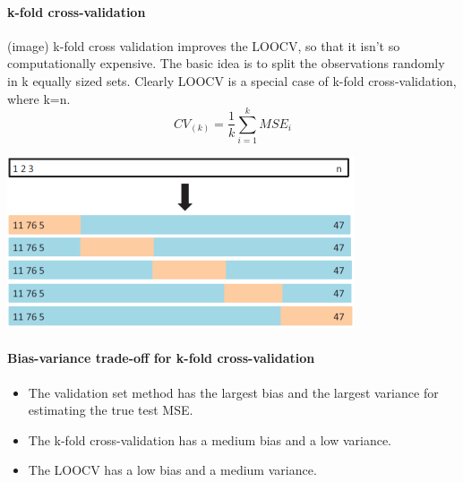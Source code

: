 \documentclass[../document.tex]{subfiles}
\begin{document}
	\paragraph{k-fold cross-validation}
	(image)
	k-fold cross validation improves the LOOCV, so that it isn't so computationally expensive. The basic idea is to split the observations randomly in k equally sized sets. Clearly LOOCV is a special case of k-fold cross-validation, where k=n.
	\begin{equation}
		CV_{(k)}=\frac{1}{k}\sum_{i=1}^{k}MSE_{i}
	\end{equation}
	\begin{center}
		\includegraphics[width=.6\textwidth]{pictures/cross_validation_k_fold.png}
	\end{center}
	\paragraph{Bias-variance trade-off for k-fold cross-validation}
	\begin{itemize}
		\item The validation set method has the largest bias and the largest variance for estimating the true test MSE.
		\item The k-fold cross-validation has a medium bias and a low variance.
		\item The LOOCV has a low bias and a medium variance.
		
	\end{itemize}
\end{document}
